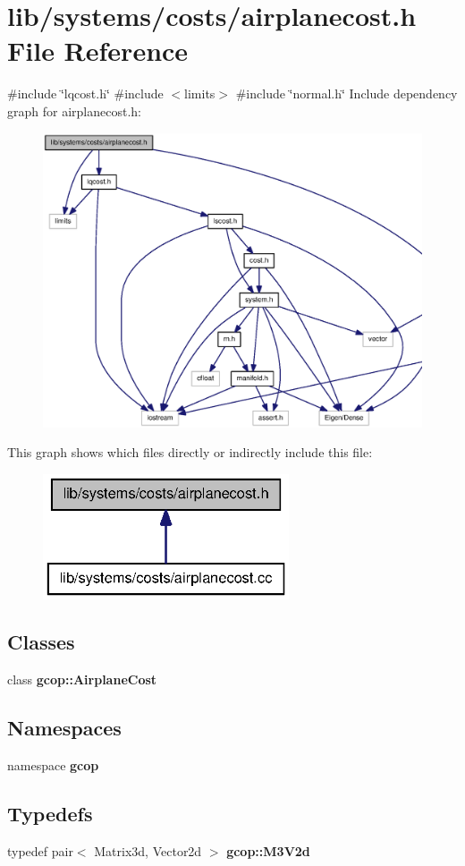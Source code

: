 \section{lib/systems/costs/airplanecost.h \-File \-Reference}
\label{airplanecost_8h}
{\ttfamily \#include \char`\"{}lqcost.\-h\char`\"{}}\*
{\ttfamily \#include $<$limits$>$}\*
{\ttfamily \#include \char`\"{}normal.\-h\char`\"{}}\*
\-Include dependency graph for airplanecost.\-h\-:\nopagebreak
\begin{figure}[H]
\begin{center}
\leavevmode
\includegraphics[width=350pt]{airplanecost_8h__incl}
\end{center}
\end{figure}
\-This graph shows which files directly or indirectly include this file\-:\nopagebreak
\begin{figure}[H]
\begin{center}
\leavevmode
\includegraphics[width=206pt]{airplanecost_8h__dep__incl}
\end{center}
\end{figure}
\subsection*{\-Classes}
\begin{DoxyCompactItemize}
\item 
class {\bf gcop\-::\-Airplane\-Cost}
\end{DoxyCompactItemize}
\subsection*{\-Namespaces}
\begin{DoxyCompactItemize}
\item 
namespace {\bf gcop}
\end{DoxyCompactItemize}
\subsection*{\-Typedefs}
\begin{DoxyCompactItemize}
\item 
typedef pair$<$ \-Matrix3d, \-Vector2d $>$ {\bf gcop\-::\-M3\-V2d}
\end{DoxyCompactItemize}
